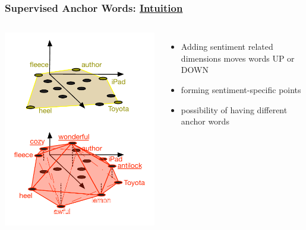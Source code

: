 \documentclass[compress]{beamer}
\begin{document}
\begin{frame}
\frametitle{Supervised Anchor Words: \underline{Intuition}}

\centering
\begin{columns}
\includegraphics[width=0.9\linewidth]{spectral/jutting_anchors.pdf}
\begin{itemize}
\item Adding sentiment related dimensions moves words UP or DOWN
\item forming sentiment-specific points
\item possibility of having different anchor words
\end{itemize}
\end{columns}
\end{frame}
\end{document}
